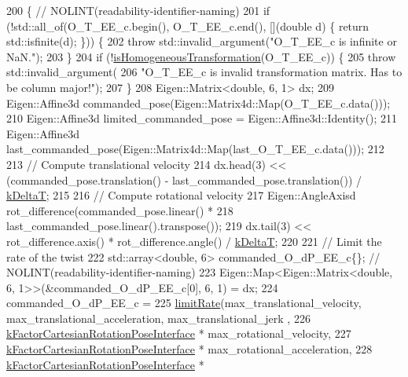 \begin{DoxyCode}
200                                                 \{  \textcolor{comment}{// NOLINT(readability-identifier-naming)}
201   \textcolor{keywordflow}{if} (!std::all\_of(O\_T\_EE\_c.begin(), O\_T\_EE\_c.end(), [](\textcolor{keywordtype}{double} d) \{ \textcolor{keywordflow}{return} std::isfinite(d); \})) \{
202     \textcolor{keywordflow}{throw} std::invalid\_argument(\textcolor{stringliteral}{"O\_T\_EE\_c is infinite or NaN."});
203   \}
204   \textcolor{keywordflow}{if} (!\hyperlink{namespacefranka_ad81c99e8af3f2536ae3c6ec1ce8dce1e}{isHomogeneousTransformation}(O\_T\_EE\_c)) \{
205     \textcolor{keywordflow}{throw} std::invalid\_argument(
206         \textcolor{stringliteral}{"O\_T\_EE\_c is invalid transformation matrix. Has to be column major!"});
207   \}
208   Eigen::Matrix<double, 6, 1> dx;
209   Eigen::Affine3d commanded\_pose(Eigen::Matrix4d::Map(O\_T\_EE\_c.data()));
210   Eigen::Affine3d limited\_commanded\_pose = Eigen::Affine3d::Identity();
211   Eigen::Affine3d last\_commanded\_pose(Eigen::Matrix4d::Map(last\_O\_T\_EE\_c.data()));
212 
213   \textcolor{comment}{// Compute translational velocity}
214   dx.head(3) << (commanded\_pose.translation() - last\_commanded\_pose.translation()) / 
      \hyperlink{namespacefranka_a1e207a0d5a6e90c1e1a78e6e1057120a}{kDeltaT};
215 
216   \textcolor{comment}{// Compute rotational velocity}
217   Eigen::AngleAxisd rot\_difference(commanded\_pose.linear() *
218                                    last\_commanded\_pose.linear().transpose());
219   dx.tail(3) << rot\_difference.axis() * rot\_difference.angle() / \hyperlink{namespacefranka_a1e207a0d5a6e90c1e1a78e6e1057120a}{kDeltaT};
220 
221   \textcolor{comment}{// Limit the rate of the twist}
222   std::array<double, 6> commanded\_O\_dP\_EE\_c\{\};  \textcolor{comment}{// NOLINT(readability-identifier-naming)}
223   Eigen::Map<Eigen::Matrix<double, 6, 1>>(&commanded\_O\_dP\_EE\_c[0], 6, 1) = dx;
224   commanded\_O\_dP\_EE\_c =
225       \hyperlink{namespacefranka_1_1anonymous__namespace_02rate__limiting_8cpp_03_aa1d64bbd7b303af83e6a76b92298d73a}{limitRate}(max\_translational\_velocity, max\_translational\_acceleration, max\_translational\_jerk
      ,
226                 \hyperlink{namespacefranka_a19166d1a64c5a84f80b4ed3aa0bfb3a0}{kFactorCartesianRotationPoseInterface} * 
      max\_rotational\_velocity,
227                 \hyperlink{namespacefranka_a19166d1a64c5a84f80b4ed3aa0bfb3a0}{kFactorCartesianRotationPoseInterface} * 
      max\_rotational\_acceleration,
228                 \hyperlink{namespacefranka_a19166d1a64c5a84f80b4ed3aa0bfb3a0}{kFactorCartesianRotationPoseInterface} * 

\end{DoxyCode}

